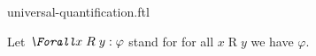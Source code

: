 \documentclass{stex}
\begin{document}
\begin{smodule}{universal-quantification.ftl}



\begin{fakeforthel}
  \begin{convention}
    Let $\emph{\Forall} x \mathrel{R} y : \varphi$ stand for for all $x \mathrel{R} y$ we have $\varphi$.
  \end{convention}
\end{fakeforthel}

\end{smodule}
\end{document}
